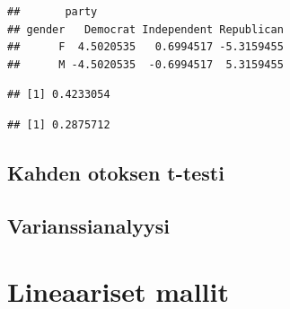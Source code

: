\documentclass[
]{book}
\newenvironment{Shaded}{\begin{snugshade}}{\end{snugshade}}
\newcommand{\AttributeTok}[1]{\textcolor[rgb]{0.77,0.63,0.00}{#1}}
\newcommand{\CommentTok}[1]{\textcolor[rgb]{0.56,0.35,0.01}{\textit{#1}}}
\newcommand{\ConstantTok}[1]{\textcolor[rgb]{0.00,0.00,0.00}{#1}}
\newcommand{\DecValTok}[1]{\textcolor[rgb]{0.00,0.00,0.81}{#1}}
\newcommand{\DocumentationTok}[1]{\textcolor[rgb]{0.56,0.35,0.01}{\textbf{\textit{#1}}}}
\newcommand{\FunctionTok}[1]{\textcolor[rgb]{0.00,0.00,0.00}{#1}}
\newcommand{\NormalTok}[1]{#1}
\newcommand{\OtherTok}[1]{\textcolor[rgb]{0.56,0.35,0.01}{#1}}
\newcommand{\SpecialCharTok}[1]{\textcolor[rgb]{0.00,0.00,0.00}{#1}}
\begin{document}
\begin{verbatim}
##       party
## gender   Democrat Independent Republican
##      F  4.5020535   0.6994517 -5.3159455
##      M -4.5020535  -0.6994517  5.3159455
\end{verbatim}

\begin{Shaded}
\end{Shaded}

\begin{verbatim}
## [1] 0.4233054
\end{verbatim}

\begin{Shaded}
\end{Shaded}

\begin{verbatim}
## [1] 0.2875712
\end{verbatim}

\hypertarget{kahden-otoksen-t-testi}{%
\section{Kahden otoksen t-testi}\label{kahden-otoksen-t-testi}}

\hypertarget{varianssianalyysi}{%
\section{Varianssianalyysi}\label{varianssianalyysi}}

\hypertarget{linear_models}{%
\chapter{Lineaariset mallit}\label{linear_models}}
\end{document}
